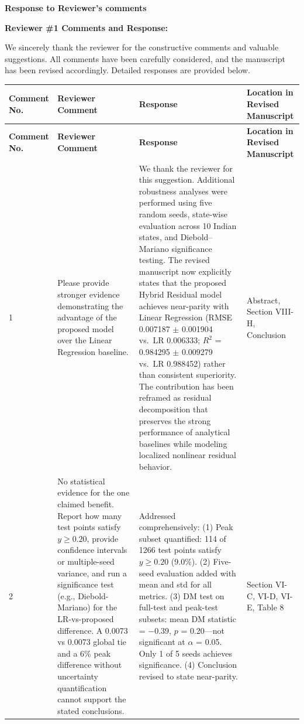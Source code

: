 \documentclass[11pt,a4paper]{article}
\begin{document}
\begin{center}
{\Large \textbf{Response to Reviewer's comments}}
\end{center}

\vspace{1em}

{\large \textbf{Reviewer \#1 Comments and Response:}}

\vspace{0.5em}
We sincerely thank the reviewer for the constructive comments and valuable suggestions. All comments have been carefully considered, and the manuscript has been revised accordingly. Detailed responses are provided below.

\vspace{0.5em}

\begin{longtable}{|p{1.5cm}|p{3.5cm}|p{6.2cm}|p{2.8cm}|}
\hline
\textbf{Comment No.} & \textbf{Reviewer Comment } & \textbf{Response} & \textbf{Location in Revised Manuscript} \\
\hline
\endfirsthead
\hline
\textbf{Comment No.} & \textbf{Reviewer Comment } & \textbf{Response} & \textbf{Location in Revised Manuscript} \\
\hline
\endhead

1 & Please provide stronger evidence demonstrating the advantage of the proposed model over the Linear Regression baseline. & We thank the reviewer for this suggestion. Additional robustness analyses were performed using five random seeds, state-wise evaluation across 10 Indian states, and Diebold--Mariano significance testing. The revised manuscript now explicitly states that the proposed Hybrid Residual model achieves near-parity with Linear Regression (RMSE 0.007187 $\pm$ 0.001904 vs.\ LR 0.006333; $R^2$ = 0.984295 $\pm$ 0.009279 vs.\ LR 0.988452) rather than consistent superiority. The contribution has been reframed as residual decomposition that preserves the strong performance of analytical baselines while modeling localized nonlinear residual behavior. & Abstract, Section VIII-H, Conclusion \\
\hline

2 & No statistical evidence for the one claimed benefit. Report how many test points satisfy $y \ge 0.20$, provide confidence intervals or multiple-seed variance, and run a significance test (e.g., Diebold-Mariano) for the LR-vs-proposed difference. A 0.0073 vs 0.0073 global tie and a 6\% peak difference without uncertainty quantification cannot support the stated conclusions. & Addressed comprehensively: (1) Peak subset quantified: 114 of 1266 test points satisfy $y \ge 0.20$ (9.0\%). (2) Five-seed evaluation added with mean and std for all metrics. (3) DM test on full-test and peak-test subsets: mean DM statistic = $-$0.39, $p$ = 0.20---not significant at $\alpha$ = 0.05. Only 1 of 5 seeds achieves significance. (4) Conclusion revised to state near-parity. & Section VI-C, VI-D, VI-E, Table 8 \\
\hline


\end{longtable}
\end{document}
